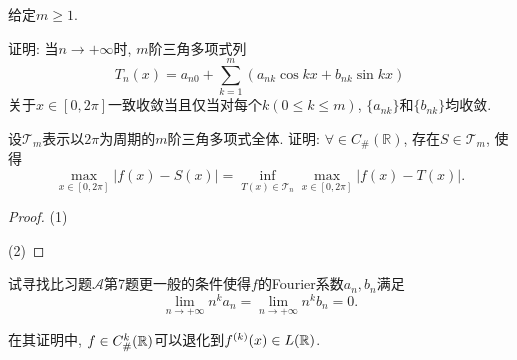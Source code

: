 \begin{quizb}
\woe 给定\(m\geqslant 1\).\begin{quizs}
\item 证明: 当\(n\rightarrow +\infty\)时, \(m\)阶三角多项式列\[T_n(x)=a_{n0}+\sum_{k=1}^{m}\left(a_{nk}\cos kx+b_{nk}\sin kx\right)\]关于\(x\in[0,2\pi]\)一致收敛当且仅当对每个\(k(0\leqslant k\leqslant m)\), \(\{a_{nk}\}\)和\(\{b_{nk}\}\)均收敛.
\item 设\(\mathcal{T}_m\)表示以\(2\pi\)为周期的\(m\)阶三角多项式全体. 证明: \(\forall\in C_{\#}\left(\mathbb{R}\right)\), 存在\(S\in\mathcal{T}_m\), 使得\[\max_{x\in [0,2\pi]}\left|f(x)-S(x)\right|=\inf_{T(x)\in\mathcal{T}_n}\max_{x\in[0,2\pi]}\left|f(x)-T(x)\right|.\]
\end{quizs}
\begin{proof}
(1)

(2)
\end{proof}
\woe 试寻找比习题\(\boldsymbol{\mathcal{A}}\)第7题更一般的条件使得\(f\)的Fourier系数\(a_n,b_n\)满足\[\lim_{n\rightarrow+\infty}n^ka_n=\lim_{n\rightarrow+\infty}n^kb_n=0.\]
\begin{solution}
在其证明中, \(f\in C_{\#}^k(\mathbb{R})\)可以退化到\(f^{(k)}(x)\in L(\mathbb{R})\).
\end{solution}
\end{quizb}

